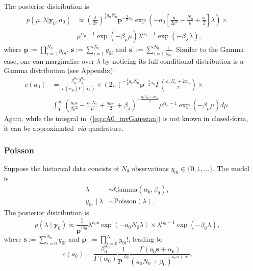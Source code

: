 \documentclass[a4paper, notitlepage, 11pt]{article}
\begin{document}
The posterior distribution is
\begin{align}
  \nonumber
 p(\mu, \lambda | \boldsymbol y_0, a_0) &\propto \left(\frac{\lambda}{2\pi}\right)^{\frac{1}{2}a_0N_0} \boldsymbol p^{-\frac{3}{2} a_0} \exp\left( -a_0\left[ \frac{\boldsymbol s}{2\mu^2} -\frac{N_0}{\mu} + \frac{\boldsymbol s^\prime}{2} \right]\lambda\right) \times \\
 \label{eq:posterior_invGauss}
 &\mu^{\alpha_\mu-1}\exp(-\beta_\mu \mu) \lambda^{\alpha_\lambda -1} \exp(-\beta_\lambda  \lambda),
\end{align}
where  $\boldsymbol p := \prod_{i =1}^{N_0} y_{0i}$,  $\boldsymbol s := \sum_{i =1}^{N_0} y_{0i}$ and $\boldsymbol s^\prime := \sum_{i =1}^{N_0} \frac{1}{y_{0i}}$.
Similar to the Gamma case, one can marginalise over $\lambda$ by noticing its full conditional distribution is a Gamma distribution (see Appendix):
\begin{align}
 \nonumber
 c(a_0) &= \frac{\beta_\mu^{\alpha_\mu}\beta_\lambda^{\alpha_\lambda} }{\Gamma(\alpha_\mu)\Gamma(\alpha_\lambda)} \times (2\pi)^{-\frac{1}{2}a_0N_0} \boldsymbol p^{-\frac{3}{2} a_0} \Gamma\left( \frac{a_0N_0 + 2\alpha_\lambda}{2} \right) \times \\
 \label{eq:cA0_invGaussian}
 & \int_0^\infty \left( \frac{a_0\boldsymbol s}{2\mu^2} -\frac{a_0N_0}{\mu} + \frac{ a_0 \boldsymbol s^\prime}{2} + \beta_\lambda \right)^{-\frac{a_0N_0 + 2\alpha_\lambda}{2}} \mu^{\alpha_\mu-1}\exp(-\beta_\mu \mu) d\mu.
\end{align}
Again, while the integral in~(\ref{eq:cA0_invGaussian}) is not known in closed-form, it can be approximated~\textit{via} quadrature.


\subsubsection{Poisson}

Suppose the historical data consists of $N_0$ observations $y_{0i} \in \{0, 1, \ldots \}$.
The model is 
\begin{align*}
 \lambda &\sim \text{Gamma}(\alpha_0, \beta_0),\\
 y_{0i} \mid \lambda &\sim \text{Poisson}(\lambda).
\end{align*}
The posterior distribution is 
\begin{equation}
 p(\lambda \mid \boldsymbol y_0) \propto \frac{1}{\boldsymbol {p^\prime}^{a_0} } \lambda^{a_0\boldsymbol s} \exp(-a_0 N_0 \lambda) \times \lambda^{\alpha_0-1} \exp(-\beta_0\lambda),
\end{equation}
where $\boldsymbol s := \sum_{i=0}^{N_0} y_{0i}$ and $\boldsymbol p^\prime := \prod_{i = 0}^{N_0} y_{0i}!$, leading to
\begin{equation}
 \label{eq:cA0_poisson}
 c(a_0) = \frac{\beta_0^{\alpha_0}}{\Gamma(\alpha_0)}\frac{1}{\boldsymbol {p^\prime}^{a_0} } \frac{\Gamma(a_0\boldsymbol s + \alpha_0)}{\left( a_0N_0 + \beta_0 \right)^{a_0\boldsymbol s + \alpha_0} }.
\end{equation}
\end{document}
